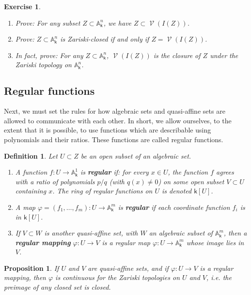 \documentclass[11pt]{article}
\newcommand{\A}{\mathbb{A}}
\renewcommand{\k}{\mathsf{k}}
\renewcommand{\to}{\longrightarrow}
\DeclareMathOperator{\V}{\mathcal{V}}
\newcommand{\A}{\mathbb A}
\renewcommand{\k}{\mathsf{k}}
\renewcommand{\to}{{\longrightarrow}}
\newtheorem{proposition}{Proposition}[section]
\newtheorem{definition}{Definition}[section]
\newtheorem{exercise}{Exercise}[section]
\begin{document}
\begin{exercise}
\begin{enumerate}
\item Prove: For any subset \(Z \subset \A^{n}_{\k}\), we have \(Z \subset \V(I(Z))\).
\item Prove:  \(Z \subset \A^n_{\k}\) is Zariski-closed if and only if \(Z = \V(I(Z))\).
\item In fact, prove: For any \(Z \subset \A^n_{\k}\), \(\V(I(Z))\) is the closure of \(Z\) under the Zariski topology on \(\A^n_{\k}\).
\end{enumerate}
\end{exercise}

\subsection{Regular functions}
\label{sec:orged41503}

Next, we must set the rules for how algebraic sets and quasi-affine sets are allowed to communicate with each other. In short, we allow ourselves, to the extent that it is possible, to use functions which are describable using polynomials and their ratios.  These functions are called regular functions.

\begin{definition}
Let \(U \subset Z\) be an open subset of an algebraic set.
\begin{enumerate}
\item A function \(f: U \to \A^1_{\k}\) is \textbf{\emph{regular}} if: for every \(x \in U\), the function \(f\) agrees with a ratio of polynomials \(p/q\) (with \(q(x) \neq 0\)) on some open subset \(V \subset U\) containing \(x\). The ring of regular functions on \(U\) is denoted \(\k[U]\).
\item A map \(\varphi = (f_1, \dots, f_m): U \to \A^m_{\k}\) is \textbf{\emph{regular}} if each coordinate function \(f_i\) is in \(\k[U]\).
\item If \(V \subset W\) is another quasi-affine set, with \(W\) an algebraic subset of \(\A^m_{\k}\), then a \textbf{\emph{regular mapping}} \(\varphi: U \to V\) is a regular map \(\varphi: U \to \A^m_{\k}\) whose image lies in \(V\).
\end{enumerate}
\end{definition}

\begin{proposition}
If \(U\) and \(V\) are quasi-affine sets, and if \(\varphi: U \to V\) is a regular mapping, then \(\varphi\) is continuous for the Zariski topologies on \(U\) and \(V\), i.e. the preimage of any closed set is closed.
\end{proposition}
\end{document}
